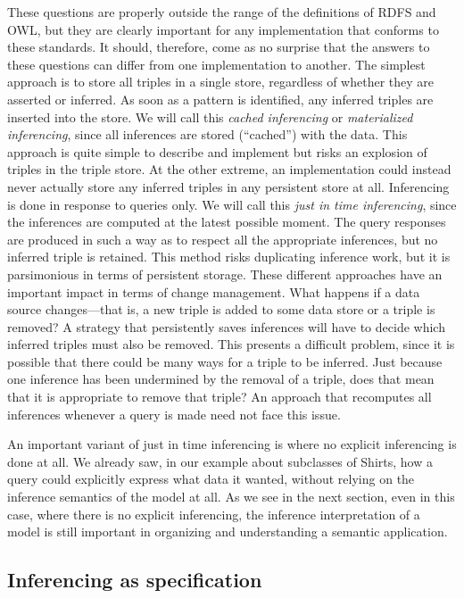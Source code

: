 These questions are properly outside the range of the definitions of
RDFS and OWL, but they are clearly important for any implementation that
conforms to these standards. It should, therefore, come as no surprise
that the answers to these questions can differ from one implementation
to another. The simplest approach is to store all triples in a single
store, regardless of whether they are asserted or inferred. As soon as a
pattern is identified, any inferred triples are inserted into the store.
We will call this \emph{cached inferencing} or \emph{materialized inferencing}, 
since all inferences are
stored (``cached'') with the data. This approach is quite simple to
describe and implement but risks an explosion of triples in the triple
store. At the other extreme, an implementation could instead never
actually store any inferred triples in any persistent store at all.
Inferencing is done in response to queries only. We will call this
\emph{just in time inferencing}, since the inferences are computed at
the latest possible moment. The query responses are produced in such a
way as to respect all the appropriate inferences, but no inferred triple
is retained. This method risks duplicating inference work, but it is
parsimonious in terms of persistent storage. These different approaches
have an important impact in terms of change management. What happens if
a data source changes---that is, a new triple is added to some data
store or a triple is removed? A strategy that persistently saves
inferences will have to decide which inferred triples must also be
removed. This presents a difficult problem, since it is possible that
there could be many ways for a triple to be inferred. Just because one
inference has been undermined by the removal of a triple, does that mean
that it is appropriate to remove that triple? An approach that
recomputes all inferences whenever a query is made need not face this
issue.

An important variant of just in time inferencing is where no explicit
inferencing is done at all. We already saw, in our example about
subclasses of Shirts, how a query could explicitly express what data it
wanted, without relying on the inference semantics of the model at all.
As we see in the next section, even in this case, where there is no
explicit inferencing, the inference interpretation of a model is still
important in organizing and understanding a semantic application.

\subsection{Inferencing as specification}


